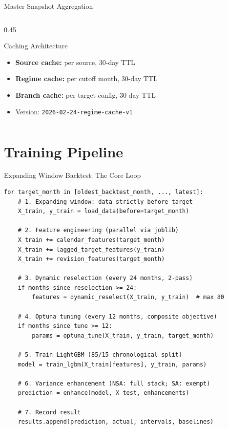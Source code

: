 \documentclass[aspectratio=169,10pt]{beamer}
\begin{document}
\begin{frame}{Master Snapshot Aggregation}
\begin{columns}[T]
\begin{column}{0.45\textwidth}
\vspace{0.1cm}
\begin{exampleblock}{Caching Architecture}
\scriptsize
\begin{itemize}
  \item \textbf{Source cache:} per source, 30-day TTL
  \item \textbf{Regime cache:} per cutoff month, 30-day TTL
  \item \textbf{Branch cache:} per target config, 30-day TTL
  \item Version: \texttt{2026-02-24-regime-cache-v1}
\end{itemize}
\end{exampleblock}
\end{column}
\end{columns}
\end{frame}

\section{Training Pipeline}

\begin{frame}[fragile]{Expanding Window Backtest: The Core Loop}
\begin{lstlisting}[style=pseudo]
for target_month in [oldest_backtest_month, ..., latest]:
    # 1. Expanding window: data strictly before target
    X_train, y_train = load_data(before=target_month)

    # 2. Feature engineering (parallel via joblib)
    X_train += calendar_features(target_month)
    X_train += lagged_target_features(y_train)
    X_train += revision_features(target_month)

    # 3. Dynamic reselection (every 24 months, 2-pass)
    if months_since_reselection >= 24:
        features = dynamic_reselect(X_train, y_train)  # max 80

    # 4. Optuna tuning (every 12 months, composite objective)
    if months_since_tune >= 12:
        params = optuna_tune(X_train, y_train, target_month)

    # 5. Train LightGBM (85/15 chronological split)
    model = train_lgbm(X_train[features], y_train, params)

    # 6. Variance enhancement (NSA: full stack; SA: exempt)
    prediction = enhance(model, X_test, enhancements)

    # 7. Record result
    results.append(prediction, actual, intervals, baselines)
\end{lstlisting}
\end{frame}
\end{document}
